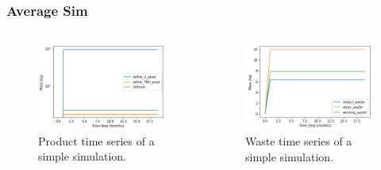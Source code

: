 \begin{frame}
\frametitle{Average Sim}
\begin{columns}
	\begin{column}{.5\textwidth}
		\begin{figure}
			\centering
			\includegraphics[width=\linewidth]{timeseries-prod}
			\caption{Product time series of a simple simulation.}
			\label{fig:timeseries-prod}
		\end{figure}
	\end{column}
	\begin{column}{.5\textwidth}
		\begin{figure}
			\centering
			\includegraphics[width=\linewidth]{timeseries-waste}
			\caption{Waste time series of a simple simulation.}
			\label{fig:timeseries-waste}
		\end{figure}
	\end{column}
\end{columns} 
\end{frame}

